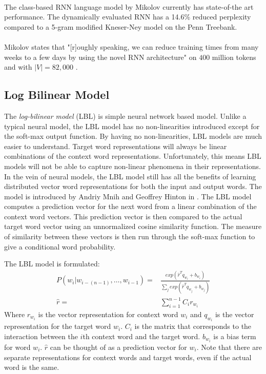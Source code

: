 \paragraph{}
The class-based RNN language model by Mikolov \cite{Mikolov2012} currently has state-of-the art performance. The dynamically evaluated RNN has a 14.6\% reduced perplexity compared to a 5-gram modified Kneser-Ney model on the Penn Treebank.
\paragraph{}
Mikolov states that "[r]oughly speaking, we can reduce training times from many weeks to a few days by using the novel RNN architecture" on $400$ million tokens and with $|V|=82,000$ \cite[pg. 93]{Mikolov2012}. 

\subsection{Log Bilinear Model} \label{sec:lbl}
The \emph{log-bilinear model} (LBL) is simple neural network based model. Unlike a typical neural model, the LBL model has no non-linearities introduced except for the soft-max output function. By having no non-linearities, LBL models are much easier to understand. Target word representations will always be linear combinations of the context word representations. Unfortunately, this means LBL models will not be able to capture non-linear phenomena in their representations. In the vein of neural models,  the LBL model still has all the benefits of learning distributed vector word representations for both the input and output words. The model is introduced by Andriy Mnih and Geoffrey Hinton in \cite{MnihHinton2007}. The LBL model computes a prediction vector for the next word from a linear combination of the context word vectors. This prediction vector is then compared to the actual target word vector using an unnormalized cosine similarity function. The measure of similarity between these vectors is then run through the soft-max function to give a conditional word probability.

The LBL model is formulated:
\begin{align}
P(w_i | w_{i-(n-1)},\dots, w_{i-1})  =& \frac{ exp( \hat{r}^T q_{w_i} +b_{w_i}) } { \sum_j exp( \hat{r}^T q_{w_j} +b_{w_j})} \label{eq:LBL}
\\ 
\hat{r} =& \sum_{i=1}^{n-1} C_i r_{w_i} \nonumber
\end{align} 
Where $r_{w_i}$ is the vector representation for context word $w_i$ and $q_{w_i}$ is the vector representation for the target word $w_i$. $C_i$ is the matrix that corresponds to the interaction between the $i$th context word and the target word. $b_{w_i}$ is a bias term for word $w_i$. $\hat{r}$ can be thought of as a prediction vector for $w_i$. Note that there are separate representations for context words and target words, even if the actual word is the same.

